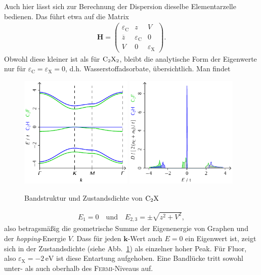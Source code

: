 \documentclass[a4paper, 10pt, twoside, openany]{book} %
\def \vec {\boldsymbol}
\def \eC {\varepsilon_\mathrm{C}}
\def \eX {\varepsilon_\mathrm{X}}
\begin{document}
	Auch hier lässt sich zur Berechnung der Dispersion dieselbe Elementarzelle bedienen. Das führt etwa auf die Matrix
	\begin{align*}
		\vec H =
		\begin{pmatrix}
			\eC         & z   & V \\
			\overline z & \eC & 0 \\
			V           & 0   & \eX
		\end{pmatrix}.
	\end{align*}
	Obwohl diese kleiner ist als für $\rm C_2X_2$, bleibt die analytische Form der Eigenwerte nur für $\eC = \eX = 0$, d.h. Wasserstoffadsorbate, übersichtlich. Man findet
	\begin{figure}
		\includegraphics[width=0.48\textwidth]{Abbildungen/Bandstrukturen/C2X.pdf}
		\hfill
		\includegraphics[width=0.48\textwidth]{Abbildungen/Bandstrukturen/DOS_C2X.pdf}
		\caption{Bandstruktur und Zustandsdichte von $\rm C_2X$}
		\label{C2X}
	\end{figure}
	\begin{align*}
		E_1 = 0 \quad \text{und} \quad E_{2, 3} = \pm \sqrt{z^2 + V^2},
	\end{align*}
	also betragsmäßig die geometrische Summe der Eigenenergie von Graphen und der \emph{hopping}-Energie $V$. Dass für jeden $\vec k$-Wert auch $E = 0$ ein Eigenwert ist, zeigt sich in der Zustandsdichte (siehe Abb.~\ref{C2X}) als einzelner hoher Peak. Für Fluor, also $\eX = -2\,\mathrm{eV}$ ist diese Entartung aufgehoben. Eine Bandlücke tritt sowohl unter- als auch oberhalb des \textsc{Fermi}-Niveaus auf.
	
\end{document}
